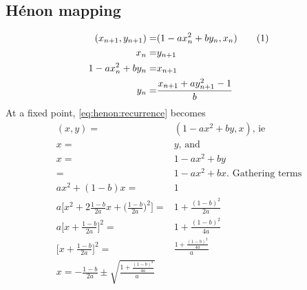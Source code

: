 \documentclass[]{article}
\newcommand\numberthis{\addtocounter{equation}{1}\tag{\theequation}}
\begin{document}
\subsection{H\'enon mapping}
\cite{henon1976two}
\begin{align*}
	(x_{n+1},y_{n+1}) =& (1-ax_n^2+by_n,x_n) \numberthis \label{eq:henon:recurrence}\\
	x_n =& y_{n+1}\\
	1-ax_n^2+by_n =& x_{n+1}\\
	y_n =& \frac{x_{n+1} + a  y_{n+1}^2-1}{b}
\end{align*}
At a fixed point, \eqref{eq:henon:recurrence} becomes
\begin{align*}
	(x,y) =& (1-ax^2+by,x)\text{, ie}\\
	x =& y \text{, and}\\
	x =& 1-ax^2 +by\\
	=& 1-ax^2 +bx\text{. Gathering terms}\\
	ax^2 + (1-b)x = &1\\
	a\big[x^2 + 2\frac{1-b}{2a}x + \big(\frac{1-b}{2a}\big)^2\big]  = &1+ \frac{(1-b)^2}{2a}\\
	a\big[x+ \frac{1-b}{2a}\big]^2= &1+ \frac{(1-b)^2}{4a}\\
	\big[x+ \frac{1-b}{2a}\big]^2= &\frac{1+ \frac{(1-b)^2}{4a}}{a}\\
	x = - \frac{1-b}{2a} \pm \sqrt{\frac{1+ \frac{(1-b)^2}{4a}}{a}}
\end{align*}


\end{document}

